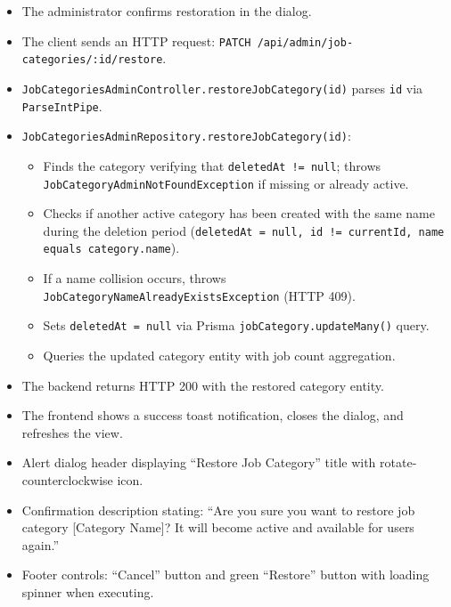 \begin{itemize}[leftmargin=1.6em,topsep=3pt,itemsep=2pt,parsep=0pt,label=$\bullet$]
    \item The administrator confirms restoration in the dialog.
    \item The client sends an HTTP request: \texttt{PATCH /api/admin/job-categories/:id/restore}.
    \item \texttt{JobCategoriesAdminController.restoreJobCategory(id)} parses \texttt{id} via \texttt{ParseIntPipe}.
    \item \texttt{JobCategoriesAdminRepository.restoreJobCategory(id)}:
        \begin{itemize}[leftmargin=1.6em,topsep=2pt,itemsep=2pt,parsep=0pt]
            \item Finds the category verifying that \texttt{deletedAt != null}; throws \texttt{JobCategory\-Admin\-Not\-Found\-Exception} if missing or already active.
            \item Checks if another active category has been created with the same name during the deletion period (\texttt{deletedAt = null, id != currentId, name equals category.name}).
            \item If a name collision occurs, throws \texttt{JobCategory\-Name\-Already\-Exists\-Exception} (HTTP 409).
            \item Sets \texttt{deletedAt = null} via Prisma \texttt{jobCategory.updateMany()} query.
            \item Queries the updated category entity with job count aggregation.
        \end{itemize}
    \item The backend returns HTTP 200 with the restored category entity.
    \item The frontend shows a success toast notification, closes the dialog, and refreshes the view.
\end{itemize}

\begin{itemize}[leftmargin=1.6em,topsep=3pt,itemsep=2pt,parsep=0pt,label=$\bullet$]
    \item Alert dialog header displaying ``Restore Job Category'' title with rotate-counterclockwise icon.
    \item Confirmation description stating: ``Are you sure you want to restore job category [Category Name]? It will become active and available for users again.''
    \item Footer controls: ``Cancel'' button and green ``Restore'' button with loading spinner when executing.
\end{itemize}

